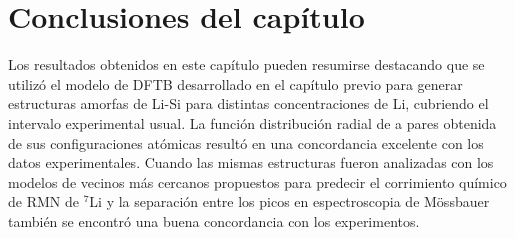 \section{Conclusiones del capítulo}

Los resultados obtenidos en este capítulo pueden resumirse destacando que 
se utilizó el modelo de DFTB desarrollado en el capítulo previo para generar 
estructuras amorfas de Li-Si para distintas concentraciones de Li, cubriendo
el intervalo experimental usual. La función distribución radial de a pares 
obtenida de sus configuraciones atómicas resultó en una concordancia excelente
con los datos experimentales. Cuando las mismas estructuras fueron analizadas 
con los modelos de vecinos más cercanos propuestos para predecir el corrimiento
químico de RMN de $^7$Li y la separación entre los picos en espectroscopia de 
Mössbauer también se encontró una buena concordancia con los experimentos.
